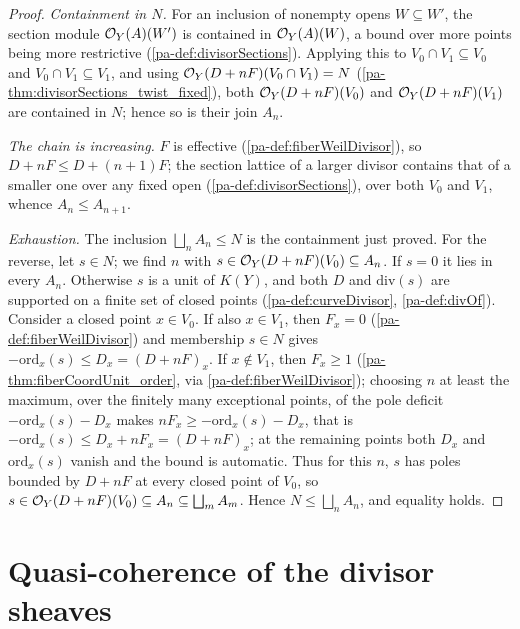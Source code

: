 \begin{proof}
  \leanok
  \emph{Containment in \(N\).} For an inclusion of nonempty opens \(W \subseteq W'\), the section
  module \(\mathcal{O}_{Y}(A)(W')\) is contained in \(\mathcal{O}_{Y}(A)(W)\), a bound over more points being more
  restrictive (\ref{pa-def:divisorSections}). Applying this to \(V_0 \cap V_1 \subseteq V_0\) and \(V_0
  \cap V_1 \subseteq V_1\), and using \(\mathcal{O}_{Y}(D + nF)(V_0 \cap V_1) = N\)
  (\ref{pa-thm:divisorSections_twist_fixed}), both \(\mathcal{O}_{Y}(D + nF)(V_0)\) and \(\mathcal{O}_{Y}(D +
  nF)(V_1)\) are contained in \(N\); hence so is their join \(A_n\).

  \emph{The chain is increasing.} \(F\) is effective (\ref{pa-def:fiberWeilDivisor}), so \(D + nF \le D +
  (n+1)F\); the section lattice of a larger divisor contains that of a smaller one over any fixed open
  (\ref{pa-def:divisorSections}), over both \(V_0\) and \(V_1\), whence \(A_n \le A_{n+1}\).

  \emph{Exhaustion.} The inclusion \(\bigsqcup_n A_n \le N\) is the containment just proved. For the
  reverse, let \(s \in N\); we find \(n\) with \(s \in \mathcal{O}_{Y}(D + nF)(V_0) \subseteq A_n\). If
  \(s = 0\) it lies in every \(A_n\). Otherwise \(s\) is a unit of \(K(Y)\), and both \(D\) and
  \(\mathrm{div}(s)\) are supported on a finite set of closed points (\ref{pa-def:curveDivisor},
  \ref{pa-def:divOf}). Consider a closed point \(x \in V_0\). If also \(x \in V_1\), then \(F_x = 0\)
  (\ref{pa-def:fiberWeilDivisor}) and membership \(s \in N\) gives \(-\mathrm{ord}_x(s) \le D_x = (D +
  nF)_x\). If \(x \notin V_1\), then \(F_x \ge 1\) (\ref{pa-thm:fiberCoordUnit_order}, via
  \ref{pa-def:fiberWeilDivisor}); choosing \(n\) at least the maximum, over the finitely many exceptional
  points, of the pole deficit \(-\mathrm{ord}_x(s) - D_x\) makes \(n F_x \ge -\mathrm{ord}_x(s) -
  D_x\), that is \(-\mathrm{ord}_x(s) \le D_x + n F_x = (D + nF)_x\); at the remaining points both
  \(D_x\) and \(\mathrm{ord}_x(s)\) vanish and the bound is automatic. Thus for this \(n\), \(s\) has
  poles bounded by \(D + nF\) at every closed point of \(V_0\), so \(s \in \mathcal{O}_{Y}(D + nF)(V_0)
  \subseteq A_n \subseteq \bigsqcup_m A_m\). Hence \(N \le \bigsqcup_n A_n\), and equality holds.
\end{proof}

\section{Quasi-coherence of the divisor sheaves}

